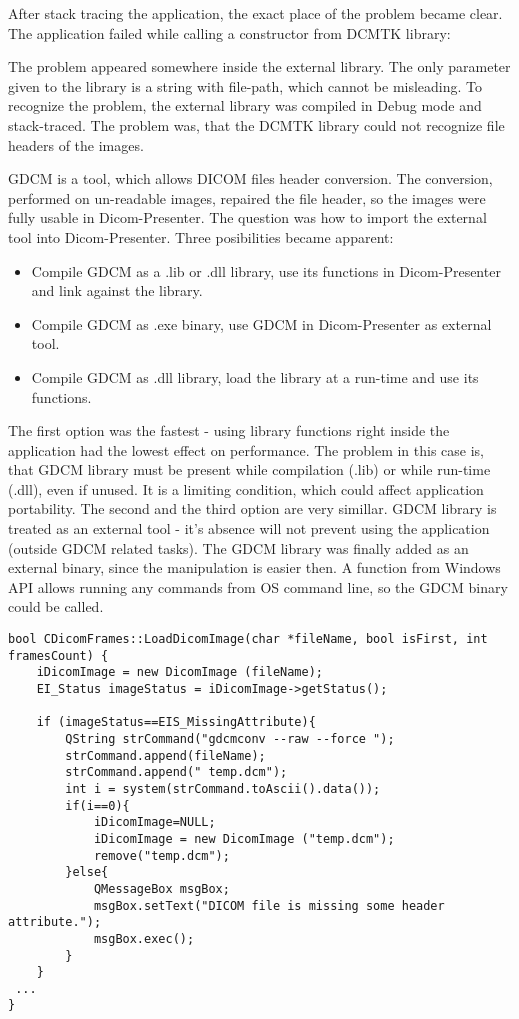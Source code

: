 After stack tracing the application, the exact place of the problem became clear. The application failed while calling a constructor from DCMTK library:


The problem appeared somewhere inside the external library. The only parameter given to the library is a string with file-path, which cannot be misleading. To recognize the problem, the external library was compiled in Debug mode and stack-traced. The problem was, that the DCMTK library could not recognize file headers of the images.

GDCM\cite{gdcm_home} is a tool, which allows DICOM files header conversion. The conversion, performed on un-readable images, repaired the file header, so the images were fully usable in Dicom-Presenter. The question was how to import the external tool into Dicom-Presenter. Three posibilities became apparent:

\begin{itemize}
\item Compile GDCM as a .lib or .dll library, use its functions in Dicom-Presenter and link against the library.
\item Compile GDCM as .exe binary, use GDCM in Dicom-Presenter as external tool.
\item Compile GDCM as .dll library, load the library at a run-time and use its functions.
\end{itemize}

The first option was the fastest - using library functions right inside the application had the lowest effect on performance. The problem in this case is, that GDCM library must be present while compilation (.lib) or while run-time (.dll), even if unused. It is a limiting condition, which could affect application portability. The second and the third option are very simillar. GDCM library is treated as an external tool - it's absence will not prevent using the application (outside GDCM related tasks). The GDCM library was finally added as an external binary, since the manipulation is easier then. A  function from Windows  API allows running any commands from OS command line, so the GDCM binary could be called.

\begin{lstlisting}[caption={A conversion of DICOM files header using GDCM as external tool.}]
bool CDicomFrames::LoadDicomImage(char *fileName, bool isFirst, int framesCount) {
	iDicomImage = new DicomImage (fileName);
	EI_Status imageStatus = iDicomImage->getStatus();

	if (imageStatus==EIS_MissingAttribute){			
		QString strCommand("gdcmconv --raw --force ");
		strCommand.append(fileName);
		strCommand.append(" temp.dcm");
		int i = system(strCommand.toAscii().data());
		if(i==0){
			iDicomImage=NULL;
			iDicomImage = new DicomImage ("temp.dcm");
			remove("temp.dcm");
		}else{
			QMessageBox msgBox;
			msgBox.setText("DICOM file is missing some header attribute.");
			msgBox.exec();
		}		
	}
 ...
}
\end{lstlisting}